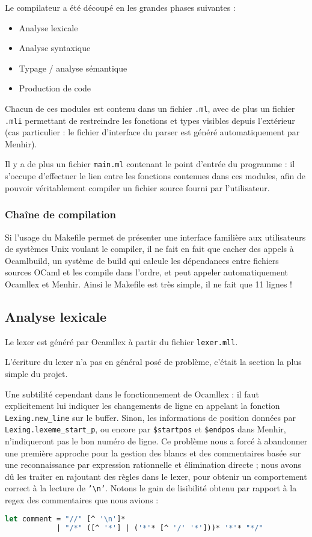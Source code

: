 \documentclass[a4paper, 11pt]{article}
\begin{document}
Le compilateur a été découpé en les grandes phases suivantes :
\begin{itemize}
\item Analyse lexicale
\item Analyse syntaxique
\item Typage / analyse sémantique
\item Production de code
\end{itemize}

Chacun de ces modules est contenu dans un fichier \texttt{.ml}, avec de plus
un fichier \texttt{.mli} permettant de restreindre les fonctions et types
visibles depuis l'extérieur (cas particulier : le fichier d'interface du parser
est généré automatiquement par Menhir).

Il y a de plus un fichier \texttt{main.ml} contenant le point d'entrée du programme :
il s'occupe d'effectuer le lien entre les fonctions contenues dans ces modules,
afin de pouvoir véritablement compiler un fichier source fourni par l'utilisateur.

\subsubsection{Chaîne de compilation}

Si l'usage du Makefile permet de présenter une interface familière aux
utilisateurs de systèmes Unix voulant le compiler, il ne fait en fait que cacher
des appels à Ocamlbuild, un système de build qui calcule les dépendances
entre fichiers sources OCaml et les compile dans l'ordre, et peut appeler automatiquement
Ocamllex et Menhir. Ainsi le Makefile est très simple, il ne fait que 11 lignes !

\subsection{Analyse lexicale}

Le lexer est généré par Ocamllex à partir du fichier \texttt{lexer.mll}.

L'écriture du lexer n'a pas en général posé de problème, c'était la section la plus
simple du projet.

Une subtilité cependant dans le fonctionnement de Ocamllex : il faut explicitement lui
indiquer les changements de ligne en appelant la fonction \texttt{Lexing.new\_line} sur
le buffer. Sinon, les informations de position données par \texttt{Lexing.lexeme\_start\_p},
ou encore par \texttt{\$startpos} et \texttt{\$endpos} dans Menhir, n'indiqueront pas
le bon numéro de ligne. Ce problème nous a forcé à abandonner une première approche pour
la gestion des blancs et des commentaires basée sur une reconnaissance par expression
rationnelle et élimination directe ; nous avons dû les traiter en rajoutant des règles
dans le lexer, pour obtenir un comportement correct à la lecture de \texttt{'\textbackslash n'}.
Notons le gain de lisibilité obtenu par rapport à la regex des commentaires que nous avions :
\begin{lstlisting}[language=Caml]
let comment = "//" [^ '\n']*
            | "/*" ([^ '*'] | ('*'* [^ '/' '*']))* '*'* "*/"
\end{lstlisting}
\end{document}
